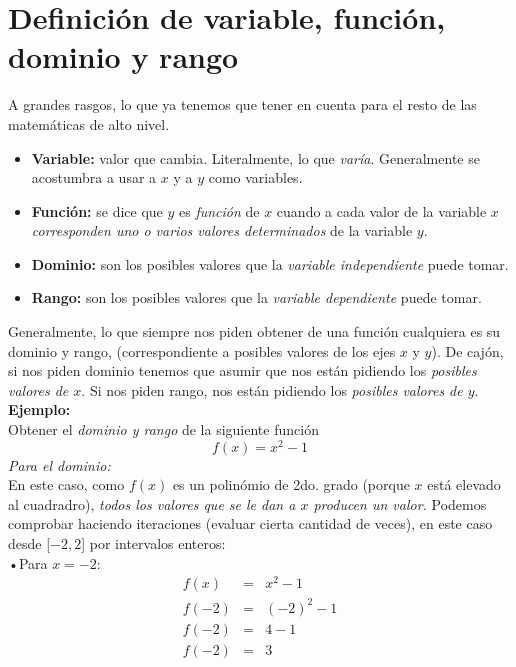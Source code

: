 \documentclass[letterpaper, 12pt]{article}
\begin{document}
        \section{Definición de variable, función, dominio y rango}
        A grandes rasgos, lo que ya tenemos que tener en cuenta para el resto de las matemáticas de alto nivel.
        \begin{itemize}
            \item \textbf{Variable: }valor que cambia. Literalmente, lo que \emph{varía}. Generalmente se acostumbra a usar a \(x\) y a \(y\) como variables.
            \item \textbf{Función: }se dice que \(y\) es \emph{función} de \(x\) cuando a cada valor de la variable \(x\) \emph{corresponden uno o varios valores determinados} de la variable \(y\).
            \item \textbf{Dominio: }son los posibles valores que la \emph{variable independiente} puede tomar.
            \item \textbf{Rango: }son los posibles valores que la \emph{variable dependiente} puede tomar.
        \end{itemize}
        Generalmente, lo que siempre nos piden obtener de una función cualquiera es su dominio y rango, (correspondiente a posibles valores de los ejes \(x\) y \(y\)). De cajón, si nos piden dominio tenemos que asumir que nos están pidiendo los \emph{posibles valores de \(x\)}. Si nos piden rango, nos están pidiendo los \emph{posibles valores de \(y\)}.
        \\\newline
        \textbf{Ejemplo: }
        \\Obtener el \emph{dominio y rango }de la siguiente función
        \[f(x)=x^2-1\]
        \emph{Para el dominio:}
        \\
        En este caso, como \(f(x)\) es un polinómio de 2do. grado (porque \(x\) está elevado al cuadradro), \emph{todos los valores que se le dan a \(x\) producen un valor.} Podemos comprobar haciendo iteraciones (evaluar cierta cantidad de veces), en este caso desde [\(-2,2\)] por intervalos enteros:
        \\\newline
            •Para \(x=-2\):
            \[\begin{matrix}
                f(x)&=&x^2-1\\
                f(-2)&=&(-2)^2-1\\
                f(-2)&=&4-1\\
                f(-2)&=&3
            \end{matrix}\]
\end{document}

